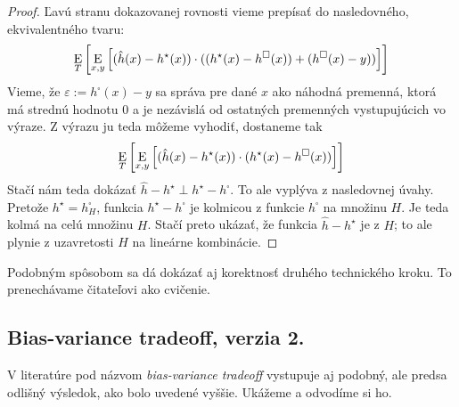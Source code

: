 \begin{proof}
  Ľavú stranu dokazovanej rovnosti vieme prepísať do nasledovného,
  ekvivalentného tvaru:
  $$ \operatorname*{\mathrm{E}}_T \left[ \operatorname*{\mathrm{E}}_{x, y} \left[ (\hat{h}(x) - h^\star(x)) \cdot ((h^\star(x) - h^\square(x)) + (h^\square(x) - y)) \right] \right] $$
  Vieme, že $\varepsilon := h^\square(x) - y$ sa správa pre dané $x$
  ako náhodná premenná, ktorá má strednú hodnotu $0$ a je nezávislá
  od ostatných premenných vystupujúcich vo výraze. Z výrazu ju teda
  môžeme vyhodiť, dostaneme tak
  $$ \operatorname*{\mathrm{E}}_T \left[ \operatorname*{\mathrm{E}}_{x, y} \left[ (\hat{h}(x) - h^\star(x)) \cdot (h^\star(x) - h^\square(x)) \right] \right] $$
  Stačí nám teda dokázať $\hat{h} - h^\star \perp h^\star - h^\square$.
  To ale vyplýva z nasledovnej úvahy. Pretože $h^\star = h^\square_H$,
  funkcia $h^\star - h^\square$ je kolmicou z funkcie $h^\square$ na
  množinu $H$. Je teda kolmá na celú množinu $H$. Stačí preto ukázať,
  že funkcia $\hat{h} - h^\star$ je z $H$; to ale plynie z uzavretosti
  $H$ na lineárne kombinácie.
\end{proof}

Podobným spôsobom sa dá dokázať aj korektnosť druhého technického
kroku. To prenechávame čitateľovi ako cvičenie.



\subsection{Bias-variance tradeoff, verzia 2.}
V literatúre pod názvom \emph{bias-variance tradeoff} vystupuje aj
podobný, ale predsa odlišný výsledok, ako bolo uvedené vyššie.
Ukážeme a odvodíme si ho.

